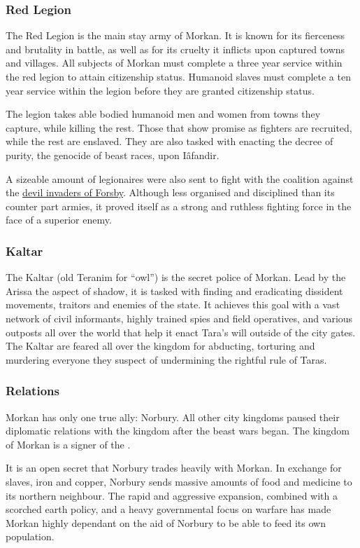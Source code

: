 \subsubsection{Red Legion}
\label{sec:Red Legion}

The Red Legion is the main stay army of Morkan. It is known for its
fierceness and brutality in battle, as well as for its cruelty it inflicts
upon captured towns and villages. All subjects of Morkan must complete a
three year service within the red legion to attain citizenship status. Humanoid
slaves must complete a ten year service within the legion before they are
granted citizenship status.

The legion takes able bodied humanoid men and women from towns they
capture, while killing the rest. Those that show promise as fighters are
recruited, while the rest are enslaved. They are also tasked with enacting the
decree of purity, the genocide of beast races, upon Iâfandir.

A sizeable amount of legionaires were also sent to fight with the coalition
against the \hyperref[sec:Devil Siege]{devil invaders of Forsby}. Although
less organised and disciplined than its counter part armies, it proved itself
as a strong and ruthless fighting force in the face of a superior enemy.

\subsubsection{Kaltar}
\label{sec:Kaltar}

The Kaltar (old Teranim for ``owl'') is the secret police of Morkan. Lead by
the Arissa the aspect of shadow, it is tasked with finding and eradicating
dissident movements, traitors and enemies of the state.  It achieves this goal
with a vast network of civil informants, highly trained spies and field
operatives, and various outposts all over the world that help it enact Tara's
will outside of the city gates. The Kaltar are feared all over the kingdom for
abducting, torturing and murdering everyone they suspect of undermining the
rightful rule of Taras.

\subsubsection{Relations}

Morkan has only one true ally: Norbury. All other city kingdoms paused their
diplomatic relations with the kingdom after the beast wars began. The kingdom
of Morkan is a signer of the .

It is an open secret that Norbury trades heavily with Morkan. In exchange for
slaves, iron and copper, Norbury sends massive amounts of food and medicine to
its northern neighbour. The rapid and aggressive expansion, combined with a
scorched earth policy, and a heavy governmental focus on warfare has made
Morkan highly dependant on the aid of Norbury to be able to feed its own
population.
